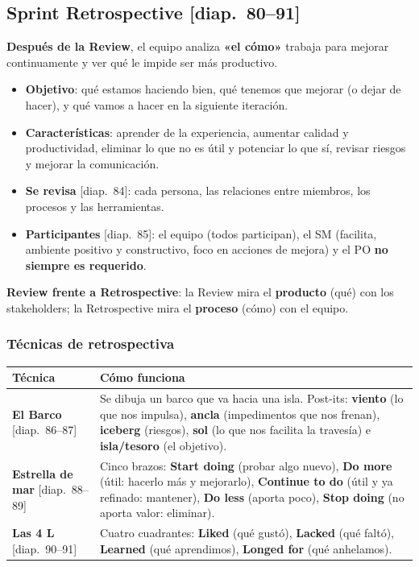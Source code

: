 \documentclass[11pt,a4paper,oneside,openany]{report}
\newcommand{\diap}[1]{\textcolor{mdaPrimary}{\small[diap.~#1]}}
\begin{document}
\subsection{Sprint Retrospective \diap{80--91}}
\textbf{Después de la Review}, el equipo analiza \textbf{«el cómo»} trabaja para mejorar continuamente y ver qué le
impide ser más productivo.
\begin{itemize}[leftmargin=*]
  \item \textbf{Objetivo}: qué estamos haciendo bien, qué tenemos que mejorar (o dejar de hacer), y qué vamos a hacer en
        la siguiente iteración.
  \item \textbf{Características}: aprender de la experiencia, aumentar calidad y productividad, eliminar lo que no es
        útil y potenciar lo que sí, revisar riesgos y mejorar la comunicación.
  \item \textbf{Se revisa} \diap{84}: cada persona, las relaciones entre miembros, los procesos y las herramientas.
  \item \textbf{Participantes} \diap{85}: el equipo (todos participan), el SM (facilita, ambiente positivo y
        constructivo, foco en acciones de mejora) y el PO \textbf{no siempre es requerido}.
\end{itemize}
\textbf{Review frente a Retrospective}: la Review mira el \textbf{producto} (qué) con los stakeholders; la Retrospective
mira el \textbf{proceso} (cómo) con el equipo.

\subsubsection*{Técnicas de retrospectiva}
\begin{center}\small
\begin{tabular}{p{2.6cm}p{11.4cm}}
\toprule
\textbf{Técnica} & \textbf{Cómo funciona} \\ \midrule
\textbf{El Barco} \diap{86--87} & Se dibuja un barco que va hacia una isla. Post-its: \textbf{viento} (lo que nos impulsa), \textbf{ancla} (impedimentos que nos frenan), \textbf{iceberg} (riesgos), \textbf{sol} (lo que nos facilita la travesía) e \textbf{isla/tesoro} (el objetivo). \\
\textbf{Estrella de mar} \diap{88--89} & Cinco brazos: \textbf{Start doing} (probar algo nuevo), \textbf{Do more} (útil: hacerlo más y mejorarlo), \textbf{Continue to do} (útil y ya refinado: mantener), \textbf{Do less} (aporta poco), \textbf{Stop doing} (no aporta valor: eliminar). \\
\textbf{Las 4 L} \diap{90--91} & Cuatro cuadrantes: \textbf{Liked} (qué gustó), \textbf{Lacked} (qué faltó), \textbf{Learned} (qué aprendimos), \textbf{Longed for} (qué anhelamos). \\
\bottomrule
\end{tabular}
\end{center}
\end{document}
